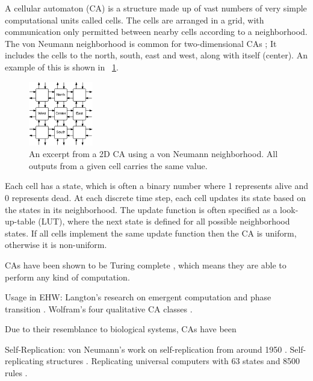 
A cellular automaton (CA) is a structure made up of vast numbers of very simple computational units called cells.
The cells are arranged in a grid, with communication only permitted between nearby cells according to a neighborhood.
The von Neumann neighborhood is common for two-dimensional CAs \CN;
It includes the cells to the north, south, east and west, along with itself (center).
An example of this is shown in \figurename~\ref{fig:ca}.

\begin{figure}[!ht]
    \centering
    \includegraphics[width=0.25\textwidth]{figures/ca}
    \caption{An excerpt from a 2D CA using a von Neumann neighborhood. All outputs from a given cell carries the same value.}
    \label{fig:ca}
\end{figure}

Each cell has a state, which is often a binary number where 1 represents alive and 0 represents dead.
At each discrete time step, each cell updates its state based on the states in its neighborhood.
The update function is often specified as a look-up-table (LUT), where the next state is defined for all possible neighborhood states\footnotemark.
If all cells implement the same update function then the CA is uniform, otherwise it is non-uniform.

CAs have been shown to be Turing complete \cite{neumann1966selfreplication, codd1968cellular}, which means they are able to perform any kind of computation.


Usage in EHW:
Langton's research on emergent computation and phase transition \cite{langton1990edgeofchaos}.
Wolfram's four qualitative CA classes \cite{wolfram1984complexity}.

Due to their resemblance to biological systems, CAs have been 

Self-Replication:
von Neumann's work on self-replication from around 1950 \cite{neumann1966selfreplication}.
Self-replicating structures \cite{reggia1998neumann}.
Replicating universal computers with 63 states and 8500 rules \cite{perrier1996toward}.

